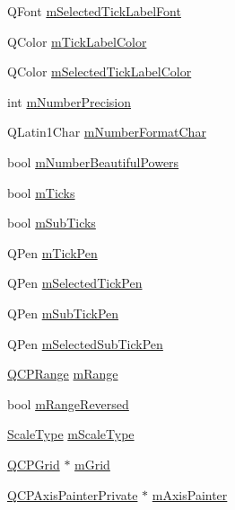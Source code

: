 \begin{DoxyCompactItemize}
Q\+Font \mbox{\hyperlink{class_q_c_p_axis_a4f2e4919da9615dac612662c249b1119}{m\+Selected\+Tick\+Label\+Font}}
\item 
Q\+Color \mbox{\hyperlink{class_q_c_p_axis_a6384a749b3b56a97df081d8082321ab4}{m\+Tick\+Label\+Color}}
\item 
Q\+Color \mbox{\hyperlink{class_q_c_p_axis_a3bcad40902f45dc4c991a2c3e4d31d70}{m\+Selected\+Tick\+Label\+Color}}
\item 
int \mbox{\hyperlink{class_q_c_p_axis_acd76e8c783384d99ccc4a13797eec188}{m\+Number\+Precision}}
\item 
Q\+Latin1\+Char \mbox{\hyperlink{class_q_c_p_axis_a39594313deef458f425bba25cd337a8a}{m\+Number\+Format\+Char}}
\item 
bool \mbox{\hyperlink{class_q_c_p_axis_af03809bee3f3e35fcc38d25b6dd5003b}{m\+Number\+Beautiful\+Powers}}
\item 
bool \mbox{\hyperlink{class_q_c_p_axis_ab111e74bba22e06848897c932fc549fe}{m\+Ticks}}
\item 
bool \mbox{\hyperlink{class_q_c_p_axis_af16aab9c3effa482fa10e7dd5c3d91f3}{m\+Sub\+Ticks}}
\item 
Q\+Pen \mbox{\hyperlink{class_q_c_p_axis_a1d52c78c856d8bd1f331d4ec4e63d944}{m\+Tick\+Pen}}
\item 
Q\+Pen \mbox{\hyperlink{class_q_c_p_axis_a9524593dbc75a5c5b29dbd1cb4b37df5}{m\+Selected\+Tick\+Pen}}
\item 
Q\+Pen \mbox{\hyperlink{class_q_c_p_axis_a32ef56d3a417866720eb12667d27dbd1}{m\+Sub\+Tick\+Pen}}
\item 
Q\+Pen \mbox{\hyperlink{class_q_c_p_axis_aa5cc6afc5dc2a365f5abbd36eb04a1dc}{m\+Selected\+Sub\+Tick\+Pen}}
\item 
\mbox{\hyperlink{class_q_c_p_range}{Q\+C\+P\+Range}} \mbox{\hyperlink{class_q_c_p_axis_a1ee36773c49062d751560e11f90845f7}{m\+Range}}
\item 
bool \mbox{\hyperlink{class_q_c_p_axis_a5cb034f57aa3d773a9ca55a0931dbf7b}{m\+Range\+Reversed}}
\item 
\mbox{\hyperlink{class_q_c_p_axis_a36d8e8658dbaa179bf2aeb973db2d6f0}{Scale\+Type}} \mbox{\hyperlink{class_q_c_p_axis_ad706039549cbbbec5fcb2baf7894e04d}{m\+Scale\+Type}}
\item 
\mbox{\hyperlink{class_q_c_p_grid}{Q\+C\+P\+Grid}} $\ast$ \mbox{\hyperlink{class_q_c_p_axis_a17bffb94aaa40311f259c6ac7bcb5d5f}{m\+Grid}}
\item 
\mbox{\hyperlink{class_q_c_p_axis_painter_private}{Q\+C\+P\+Axis\+Painter\+Private}} $\ast$ \mbox{\hyperlink{class_q_c_p_axis_aeeae00935bd2dab82d64f32544a90913}{m\+Axis\+Painter}}

\end{DoxyCompactItemize}
